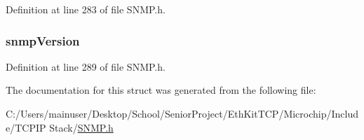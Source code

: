 Definition at line 283 of file S\+N\+M\+P.\+h.

\hypertarget{struct_p_d_u___i_n_f_o_a11089a22af489151204a9d57e75429ad}{}
\subsubsection[{snmp\+Version}]{ snmp\+Version}\label{struct_p_d_u___i_n_f_o_a11089a22af489151204a9d57e75429ad}


Definition at line 289 of file S\+N\+M\+P.\+h.



The documentation for this struct was generated from the following file\+:\begin{DoxyCompactItemize}
\item 
C\+:/\+Users/mainuser/\+Desktop/\+School/\+Senior\+Project/\+Eth\+Kit\+T\+C\+P/\+Microchip/\+Include/\+T\+C\+P\+I\+P Stack/\hyperlink{_s_n_m_p_8h}{S\+N\+M\+P.\+h}\end{DoxyCompactItemize}

